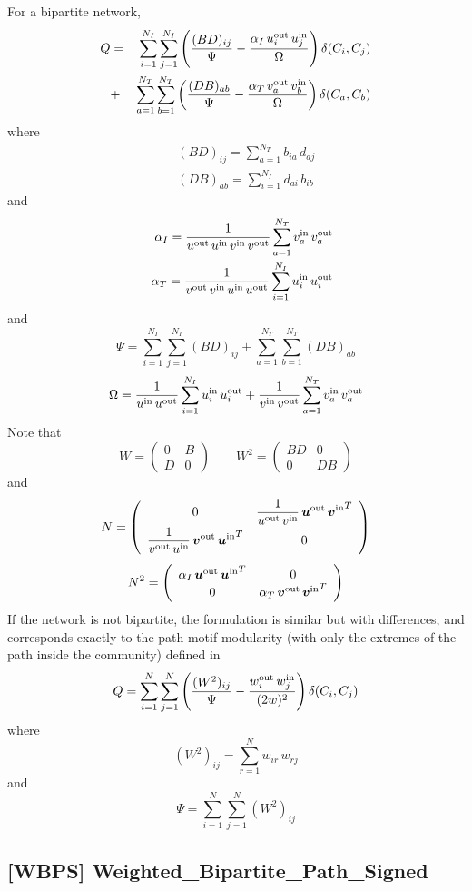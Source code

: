 \documentclass[11pt]{article}
\newcommand{\beq}{\begin{equation}}
\newcommand{\eeq}{\end{equation}}
\newcommand{\ba}[1]{\begin{array}{#1}}
\newcommand{\ea}{\end{array}}
\newcommand{\bea}{\begin{eqnarray}}
\newcommand{\eea}{\end{eqnarray}}
\newcommand{\ds}{\displaystyle}
\newcommand{\sz}{\scriptsize}
\newcommand{\bm}[1]{\mbox{\boldmath $#1$}}
\newcommand{\wout}[2]{{#1}_{#2}^{\mbox{\sz out}}}
\newcommand{\win}[2]{{#1}_{#2}^{\mbox{\sz in}}}
\begin{document}
For a bipartite network,
\bea
  Q &=& \sum_{i=1}^{N_I} \sum_{j=1}^{N_I} \left(
          \frac{(BD)_{ij}}{\Psi} - \frac{\alpha_I\,\wout{u}{i}\,\win{u}{j}}{\Omega}
        \right)\delta(C_i,C_j)
        \\
    &+& \sum_{a=1}^{N_T} \sum_{b=1}^{N_T} \left(
          \frac{(DB)_{ab}}{\Psi} - \frac{\alpha_T\,\wout{v}{a}\,\win{v}{b}}{\Omega}
        \right)\delta(C_a,C_b)
\eea
where
\bea
  && (BD)_{ij} = \ds \sum_{a=1}^{N_T} b_{ia}\,d_{aj}
  \\
  && (DB)_{ab} = \ds \sum_{i=1}^{N_I} d_{ai}\,b_{ib}
\eea
and
\bea
  && \alpha_I = \ds \frac{1}{\wout{u}{}\,\win{u}{}\,\win{v}{}\,\wout{v}{}}
                     \sum_{a=1}^{N_T} \win{v}{a}\,\wout{v}{a}
  \\
  && \alpha_T = \ds \frac{1}{\wout{v}{}\,\win{v}{}\,\win{u}{}\,\wout{u}{}}
                     \sum_{i=1}^{N_I} \win{u}{i}\,\wout{u}{i}
\eea
and
\beq
  \Psi = \sum_{i=1}^{N_I} \sum_{j=1}^{N_I} (BD)_{ij}
       + \sum_{a=1}^{N_T} \sum_{b=1}^{N_T} (DB)_{ab}
\eeq
\beq
  \Omega = \frac{1}{\win{u}{}\,\wout{u}{}} \sum_{i=1}^{N_I} \win{u}{i}\,\wout{u}{i}
         + \frac{1}{\win{v}{}\,\wout{v}{}} \sum_{a=1}^{N_T} \win{v}{a}\,\wout{v}{a}
\eeq
Note that
\beq
  W = \left(
        \ba{cc}
          0 & B \\
          D & 0
        \ea
      \right)
      \quad\quad
  W^2 = \left(
          \ba{cc}
            BD & 0    \\
            0    & DB
          \ea
        \right)
\eeq
and
\beq
  N = \left(
        \ba{cc}
          0 & \ds\frac{1}{\wout{u}{}\,\win{v}{}}\,\wout{\bm{u}}{}\,{\win{\bm{v}}{}}^T \\
          \ds\frac{1}{\wout{v}{}\,\win{u}{}}\,\wout{\bm{v}}{}\,{\win{\bm{u}}{}}^T & 0
        \ea
      \right)
\eeq
\beq
  N^2 = \left(
          \ba{cc}
          \alpha_I\,\wout{\bm{u}}{}\,{\win{\bm{u}}{}}^T & 0 \\
          0 & \alpha_T\,\wout{\bm{v}}{}\,{\win{\bm{v}}{}}^T
          \ea
        \right)
\eeq
If the network is not bipartite, the formulation is similar but with differences, and corresponds exactly to the path motif modularity (with only the extremes of the path inside the community) defined in \cite{motif}
\beq
  Q = \sum_{i=1}^{N} \sum_{j=1}^{N} \left(
        \frac{(W^2)_{ij}}{\Psi} - \frac{\wout{w}{i}\,\win{w}{j}}{(2w)^2}
      \right)\delta(C_i,C_j)
\eeq
where
\beq
  (W^2)_{ij} = \sum_{r=1}^{N} w_{ir}\,w_{rj}
\eeq
and
\beq
  \Psi = \sum_{i=1}^{N} \sum_{j=1}^{N} (W^2)_{ij}
\eeq


\subsection{[WBPS] Weighted\_Bipartite\_Path\_Signed}
\end{document}
